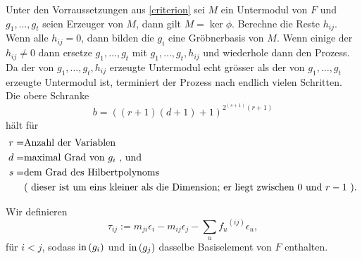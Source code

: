 \documentclass{article}
\begin{document}
	\begin{algo}
		Unter den Vorraussetzungen aus \ref{criterion} 
		sei
		\( M \)
		ein Untermodul von
		\( F \)
		und 
		\( g_{1},\dots,g_{t}\)
		seien  Erzeuger von 
		\( M \), 
		dann gilt
		\( M = \ker \phi .\)
		Berechne die Reste
		\( h_{ij} \).
		Wenn alle 
		\( h_{ij} = 0 \),
		dann bilden die 
		\(g_{i} \)
		eine Gr\"obnerbasis von 
		\( M \).
		Wenn einige der 
		\( h_{ij} \neq 0 \)
		dann ersetze 
		\( g_{1},\dots,g_{t}\)
		mit 
		\( g_{1},\dots,g_{t},h_{ij} \)
		und wiederhole dann den Prozess.
		Da der von
		\( g_{1},\dots,g_{t},h_{ij} \)
		erzeugte Untermodul echt gr\"osser als der von
		\( g_{1},\dots,g_{t}\)
		erzeugte Untermodul ist, 
		terminiert der Prozess nach endlich vielen Schritten. \\
		Die obere Schranke 
		\[
			b=\left( 
				\left( r+1 \right)
				\left( d+1 \right)+1 
			\right)^{2^{(s+1)}(r+1) }
		\]	
		h\"alt f\"ur
		\begin{align*}	
			r = &\text{Anzahl der Variablen} \\
			d = &\text{maximal Grad von \( g_i\) , und  } \\
			s = &\text{dem Grad des Hilbertpolynoms} \\
			    &\text{(  dieser ist um eins kleiner als die Dimension;
			    er liegt zwischen \( 0 \) und \(r-1\) ).}
		\end{align*}

	\end{algo}
	\begin{defn}
		Wir definieren
		\[
			\tau_{ij}:=
			m_{ji}\epsilon_{i} - 
			m_{ij} \epsilon_{j} - 
			\sum_{u} {f_{u}}^{\left( ij \right) } 
			\epsilon_{u} 
		,\]
		f\"ur
		\( i < j \),
		sodass 
		\( \operatorname{in} \left( g_{i}  \right) \)
		und
		\( \operatorname{in} \left( g_{j}  \right) \)
		dasselbe Basiselement von \( F \)
		enthalten.
	\end{defn}
\end{document}
